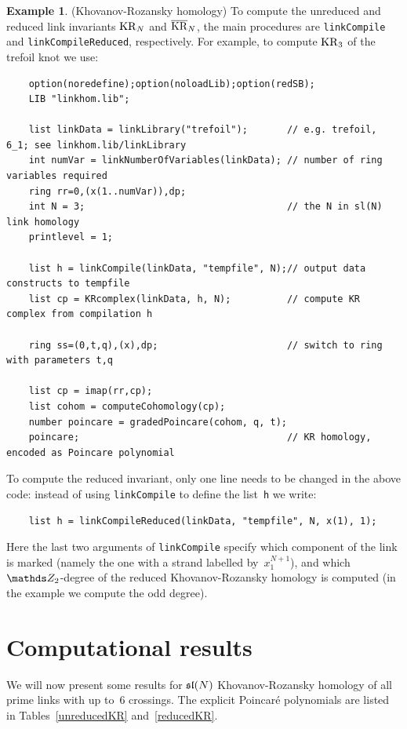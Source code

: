 \documentclass{compositio}
\theoremstyle{definition}
\newtheorem{example}[theorem]{Example}
\numberwithin{equation}{section}
\begin{document}
\begin{example}(Khovanov-Rozansky homology) \label{KRexample}
To compute the unreduced and reduced link invariants $\operatorname{KR}_{N}$ and $\overline{\operatorname{KR}}_{N}$, the main procedures are \texttt{linkCompile} and \texttt{linkCompileReduced}, respectively. For example, to compute $\operatorname{KR}_{3}$ of the trefoil knot we use: 
{\footnotesize
\begin{verbatim}
    option(noredefine);option(noloadLib);option(redSB);
    LIB "linkhom.lib";
    
    list linkData = linkLibrary("trefoil");       // e.g. trefoil, 6_1; see linkhom.lib/linkLibrary
    int numVar = linkNumberOfVariables(linkData); // number of ring variables required
    ring rr=0,(x(1..numVar)),dp;
    int N = 3;                                    // the N in sl(N) link homology
    printlevel = 1;
    
    list h = linkCompile(linkData, "tempfile", N);// output data constructs to tempfile
    list cp = KRcomplex(linkData, h, N);          // compute KR complex from compilation h
    
    ring ss=(0,t,q),(x),dp;                       // switch to ring with parameters t,q
    
    list cp = imap(rr,cp);
    list cohom = computeCohomology(cp);
    number poincare = gradedPoincare(cohom, q, t);
    poincare;                                     // KR homology, encoded as Poincare polynomial
\end{verbatim}
}
\noindent To compute the reduced invariant, only one line needs to be changed in the above code: instead of using \texttt{linkCompile} to define the list~\texttt{h} we write: 
{\footnotesize
\begin{verbatim}
    list h = linkCompileReduced(linkData, "tempfile", N, x(1), 1);
\end{verbatim}
}
\noindent Here the last two arguments of \texttt{linkCompile} specify which component of the link is marked (namely the one with a strand labelled by~$x_{1}^{N+1}$), and which $\nZ_{2}$-degree of the reduced Khovanov-Rozansky homology is computed (in the example we compute the odd degree). 
\end{example}



\section{Computational results}
\label{compres}

We will now present some results for $\mathfrak{sl}(N)$ Khovanov-Rozansky homology of all prime links with up to~6 crossings. The explicit Poincar\'e polynomials are listed in Tables~\ref{unreducedKR} and~\ref{reducedKR}. 
\end{document}
